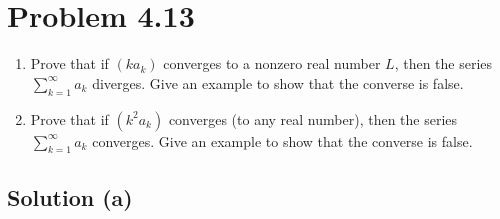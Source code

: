 \documentclass[12pt]{report}
\begin{document}
\section{Problem 4.13}
    \begin{enumerate}[label=(\alph*)]
        \item   Prove that if $(k a_k)$ converges to a nonzero real number $L$, then  the series $\sum_{k = 1}^{\infty} a_k$ diverges. Give an example to show that the  converse is false. 
        \item   Prove that if $(k^2 a_k)$ converges (to any real number), then the  series $\sum_{k = 1}^{\infty} a_k$ converges. Give an example to show that the  converse is false. 
    \end{enumerate}

    \subsection{Solution (a)}
\end{document}
